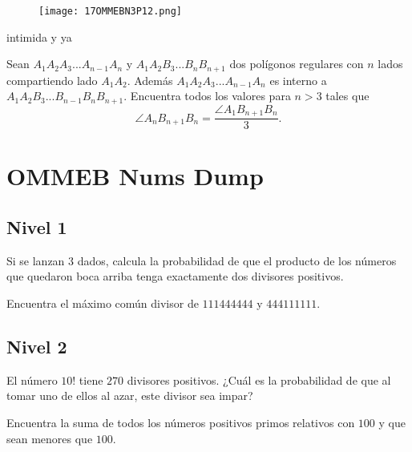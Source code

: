 \begin{figure}[h]
    \centering
    \texttt{[image: 17OMMEBN3P12.png]}
\end{figure}

intimida y ya

\begin{problem}[OMMEB 2017]
    Sean $A_1A_2A_3...A_{n-1}A_n$ y $A_1A_2B_3...B_nB_{n+1}$ 
    dos polígonos regulares con $n$ lados compartiendo lado 
    $A_1A_2$. Además $A_1A_2A_3...A_{n-1}A_n$ es interno a 
    $A_1A_2B_3...B_{n-1}B_nB_{n+1}$. Encuentra todos los valores 
    para $n>3$ tales que 
    \[
    \angle A_nB_{n+1}B_n= \frac{\angle A_1B_{n+1}B_n}{3}.
    \] 
\end{problem}

\chapter{OMMEB Nums Dump}

\section{Nivel 1}

\begin{problem}[OMMEB 2017]
    Si se lanzan \(3\) dados, calcula la probabilidad de que el 
    producto de los números que quedaron boca arriba tenga 
    exactamente dos divisores positivos.
\end{problem}

\begin{problem}[OMMEB 2017]
    Encuentra el máximo común divisor de \(111444444\) y 
    \(444111111\).
\end{problem}

\section{Nivel 2}

\begin{problem}[OMMEB 2017]
    El número \(10!\) tiene \(270\) divisores positivos. 
    ¿Cuál es la probabilidad de que al tomar uno de ellos al 
    azar, este divisor sea impar?
\end{problem}

\begin{problem}[OMMEB 2017]
    Encuentra la suma de todos los números positivos primos 
    relativos con \(100\) y que sean menores que \(100\).
\end{problem}

